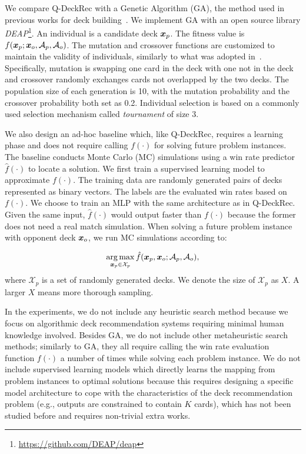 We compare Q-DeckRec with a Genetic Algorithm (GA), the method used in previous works for deck building~\cite{garcia2016evolutionary,bjorke2017deckbuilding}. We implement GA with an open source library \textit{DEAP}\footnote{\url{https://github.com/DEAP/deap}}. An individual is a candidate deck $\boldsymbol{x}_p$. The fitness value is $f(\boldsymbol{x}_p; \boldsymbol{x}_o, \mathcal{A}_p, \mathcal{A}_o)$. The mutation and crossover functions are customized to maintain the validity of individuals, similarly to what was adopted in~\cite{bjorke2017deckbuilding}. Specifically, mutation is swapping one card in the deck with one not in the deck and crossover randomly exchanges cards not overlapped by the two decks. The population size of each generation is 10, with the mutation probability and the crossover probability both set as 0.2. Individual selection is based on a commonly used selection mechanism called \textit{tournament} of size 3. 

We also design an ad-hoc baseline which, like Q-DeckRec, requires a learning phase and does not require calling $f(\cdot)$ for solving future problem instances. The baseline conducts Monte Carlo (MC) simulations using a win rate predictor $\hat{f}(\cdot)$ to locate a solution. We first train a supervised learning model to approximate $f(\cdot)$. The training data are randomly generated pairs of decks represented as binary vectors. The labels are the evaluated win rates based on $f(\cdot)$. We choose to train an MLP with the same architecture as in Q-DeckRec. Given the same input, $\hat{f}(\cdot)$ would output faster than $f(\cdot)$ because the former does not need a real match simulation. When solving a future problem instance with opponent deck $\boldsymbol{x}_o$, we run MC simulations according to:

\begin{align}
\operatorname*{arg\,max}_{\boldsymbol{x}_p \in \mathcal{X}_p} \hat{f}(\boldsymbol{x}_p, \boldsymbol{x}_o; \mathcal{A}_p, \mathcal{A}_o),
\label{eqn:mcmaxobj}
\end{align}
where $\mathcal{X}_p$ is a set of randomly generated decks. We denote the size of $\mathcal{X}_p$ as $X$. A larger $X$ means more thorough sampling.

In the experiments, we do not include any heuristic search method because we focus on algorithmic deck recommendation systems requiring minimal human knowledge involved. Besides GA, we do not include other metaheuristic search methods; similarly to GA, they all require calling the win rate evaluation function $f(\cdot)$ a number of times while solving each problem instance. We do not include  supervised learning models which directly learns the mapping from problem instances to optimal solutions because this requires designing a specific model architecture to cope with the characteristics of the deck recommendation problem (e.g., outputs are constrained to contain $K$ cards), which has not been studied before and requires non-trivial extra works.

